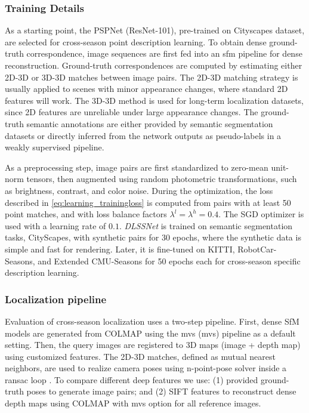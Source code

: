 \subsubsection{Training Details}
As a starting point, the PSPNet \cite{li2018pyramid} (ResNet-101), pre-trained on Cityscapes \cite{cordts2016cityscapes} dataset, are selected for cross-season point description learning.
To obtain dense ground-truth correspondence, image sequences are first fed into an \acrshort{sfm} pipeline for dense reconstruction. 
Ground-truth correspondences are computed by estimating either 2D-3D or 3D-3D matches between image pairs.  
The 2D-3D matching strategy is usually applied to scenes with minor appearance changes, where standard 2D features will work.  
The 3D-3D method is used for long-term localization datasets, since 2D features are unreliable under large appearance changes.
The ground-truth semantic annotations are either provided by semantic segmentation datasets or directly inferred from the network outputs as pseudo-labels in a weakly supervised pipeline. 

As a preprocessing step, image pairs are first standardized to zero-mean unit-norm tensors, then augmented using random photometric transformations, such as brightness, contrast, and color noise.
During the optimization, the loss described in \eqref{eq:learning_trainingloss} is computed from pairs with at least 50 point matches, and with loss balance factors $\lambda^l = \lambda^h = 0.4$. 
The SGD optimizer is used with a learning rate of $0.1$.
{\em DLSSNet} is trained on semantic segmentation tasks, CityScapes, with synthetic pairs for 30 epochs, where the synthetic data is simple and fast for rendering. 
Later, it is fine-tuned on KITTI, RobotCar-Seasons, and Extended CMU-Seasons for 50 epochs each for cross-season specific description learning.  


\subsubsection{Localization pipeline}
Evaluation of cross-season localization uses a two-step pipeline. 
First, dense SfM models are generated from COLMAP \cite{schoenberger2016sfm} using the \acrlong{mvs} (\acrshort{mvs}) \cite{schoenberger2016mvs} pipeline as a default setting. 
Then, the query images are registered to 3D maps (image + depth map) using customized features.
The 2D-3D matches, defined as mutual nearest neighbors, are used to realize camera poses using n-point-pose solver \cite{kneip2011novel}
inside a \acrshort{ransac} loop \cite{fischler1981random}.   
To compare different deep features we use: 
(1) provided ground-truth poses to generate image pairs; and 
(2) SIFT \cite{lowe2004distinctive} features to reconstruct dense depth maps using COLMAP with \acrshort{mvs} option for all reference images.

